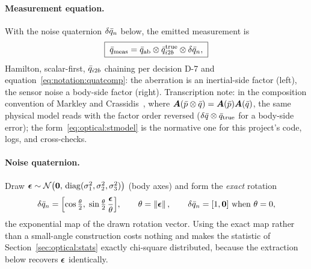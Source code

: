 \paragraph{Measurement equation.} With the noise quaternion
$\delta\bar{q}_n$ below, the emitted measurement is
\begin{equation}
  \boxed{\;
  \bar{q}_{\mathrm{meas}}
    = \bar{q}_{\mathrm{ab}} \otimes \bar{q}_{i2b}^{\mathrm{true}}
      \otimes \delta\bar{q}_n ,
  \;}
  \label{eq:optical:stmodel}
\end{equation}
Hamilton, scalar-first, $\bar{q}_{i2b}$ chaining per decision D-7 and
equation~\eqref{eq:notation:quatcomp}: the aberration is an
inertial-side factor (left), the sensor noise a body-side factor
(right). Transcription note: in the composition convention of Markley
and Crassidis~\cite{markley2014}, where $\bm{A}(\bar{p} \otimes
\bar{q}) = \bm{A}(\bar{p})\bm{A}(\bar{q})$, the same physical model
reads with the factor order reversed
($\delta\bar{q} \otimes \bar{q}_{\mathrm{true}}$ for a body-side
error); the form~\eqref{eq:optical:stmodel} is the normative one for
this project's code, logs, and cross-checks.

\paragraph{Noise quaternion.} Draw
$\bm{\epsilon} \sim \mathcal{N}\bigl(\bm{0},\,
\mathrm{diag}(\sigma_1^2, \sigma_2^2, \sigma_3^2)\bigr)$
(body axes) and form the \emph{exact} rotation
\begin{equation}
  \delta\bar{q}_n
    = \Bigl[\cos\tfrac{\theta}{2},\;
        \sin\tfrac{\theta}{2}\,\frac{\bm{\epsilon}}{\theta}\Bigr],
  \qquad \theta = \left\lVert \bm{\epsilon} \right\rVert,
  \qquad
  \delta\bar{q}_n = [1, \bm{0}] \text{ when } \theta = 0 ,
  \label{eq:optical:noiseq}
\end{equation}
the exponential map of the drawn rotation vector. Using the exact map
rather than a small-angle construction costs nothing and makes the
statistic of Section~\ref{sec:optical:stats} exactly chi-square
distributed, because the extraction below recovers $\bm{\epsilon}$
identically.

